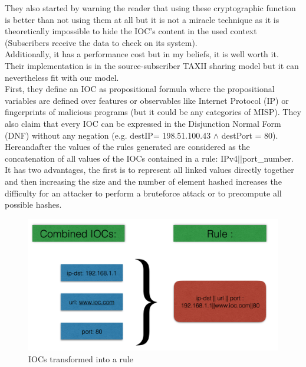 \documentclass{eplmastersthesis}
\begin{document}
They also started by warning the reader that using these cryptographic function is better than not using them at all but it is not a miracle technique as it is theoretically impossible to hide the IOC’s content in the used context (Subscribers receive the data to check on its system).\\
Additionally, it has a performance cost but in my beliefs, it is well worth it.\\ Their implementation is in the source-subscriber TAXII sharing model but it can nevertheless fit with our model.\\
First, they define an IOC as propositional formula where the propositional variables are defined over features or observables like Internet Protocol (IP) or fingerprints of malicious programs (but it could be any categories of MISP). They also claim that every IOC can be expressed in the Disjunction Normal Form (DNF) without any negation (e.g. destIP= 198.51.100.43 $\land$ destPort = 80).\\
Hereandafter the values of the rules generated are considered as the concatenation of all values of the IOCs contained in a rule: IPv4$||$port\_number. It has two advantages, the first is to represent all linked values directly together and then increasing the size and the number of element hashed increases the difficulty for an attacker to perform a bruteforce attack or to precompute all possible hashes.\\

\begin{figure}[h!]
\begin{center}
	\includegraphics[scale=0.5]{res/ioc-rules}
	\caption{IOCs transformed into a rule}
	\label{IOC-To-Rule}
\end{center}
\end{figure}
\end{document}
